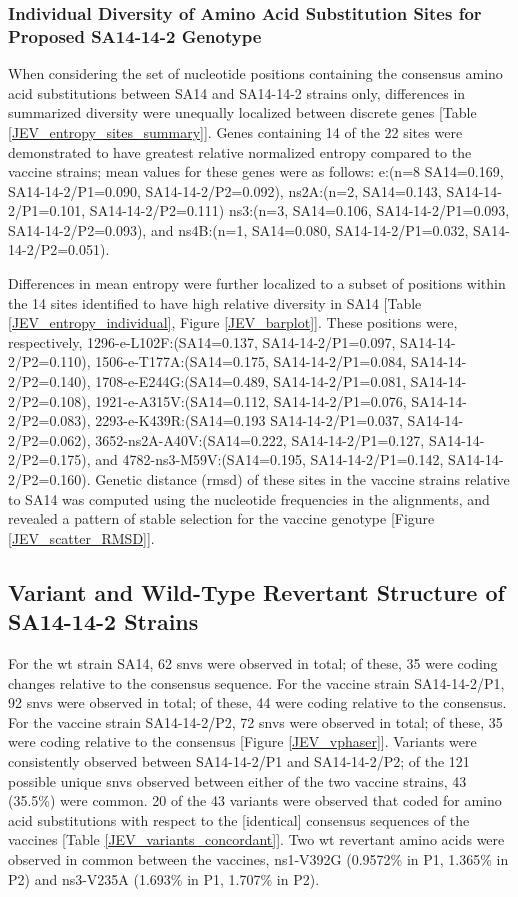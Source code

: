 \subsubsection{Individual Diversity of Amino Acid Substitution Sites for Proposed SA14-14-2 Genotype}
When considering the set of nucleotide positions containing the consensus amino acid substitutions between SA14 and SA14-14-2 strains only, differences in summarized diversity were unequally localized between discrete genes [Table \ref{JEV_entropy_sites_summary}].  Genes containing 14 of the 22  sites were demonstrated to have greatest relative normalized entropy compared to the vaccine strains; mean values for these genes were as follows: \Gls{e}:(n=8 SA14=0.169, SA14-14-2/P1=0.090, SA14-14-2/P2=0.092), \gls{ns}2A:(n=2, SA14=0.143, SA14-14-2/P1=0.101, SA14-14-2/P2=0.111) \gls{ns}3:(n=3, SA14=0.106,  SA14-14-2/P1=0.093, SA14-14-2/P2=0.093), and \gls{ns}4B:(n=1, SA14=0.080, SA14-14-2/P1=0.032, SA14-14-2/P2=0.051).

Differences in mean entropy were further localized to a subset of positions within the 14 sites identified to have high relative diversity in SA14 [Table \ref{JEV_entropy_individual}, Figure \ref{JEV_barplot}]. These positions were, respectively, 1296-\gls{e}-L102F:(SA14=0.137, SA14-14-2/P1=0.097, SA14-14-2/P2=0.110), 1506-\gls{e}-T177A:(SA14=0.175, SA14-14-2/P1=0.084, SA14-14-2/P2=0.140), 1708-\gls{e}-E244G:(SA14=0.489, SA14-14-2/P1=0.081, SA14-14-2/P2=0.108), 1921-\gls{e}-A315V:(SA14=0.112, SA14-14-2/P1=0.076, SA14-14-2/P2=0.083), 2293-\gls{e}-K439R:(SA14=0.193 SA14-14-2/P1=0.037, SA14-14-2/P2=0.062), 3652-\gls{ns}2A-A40V:(SA14=0.222, SA14-14-2/P1=0.127, SA14-14-2/P2=0.175), and 4782-\gls{ns}3-M59V:(SA14=0.195, SA14-14-2/P1=0.142, SA14-14-2/P2=0.160). Genetic distance (\gls{rmsd}) of these sites in the vaccine strains relative to SA14 was computed using the nucleotide frequencies in the alignments, and revealed a pattern of stable selection for the vaccine genotype [Figure \ref{JEV_scatter_RMSD}].

\subsection{Variant and Wild-Type Revertant Structure of SA14-14-2 Strains}
For the \gls{wt} strain SA14, 62 \glspl{snv} were observed in total; of these, 35 were coding changes relative to the consensus sequence. For the vaccine strain SA14-14-2/P1, 92 \glspl{snv} were observed in total; of these, 44 were coding relative to the consensus. For the vaccine strain SA14-14-2/P2, 72 \glspl{snv} were observed in total; of these, 35 were coding relative to the consensus [Figure \ref{JEV_vphaser}]. Variants were consistently observed between SA14-14-2/P1 and SA14-14-2/P2; of the 121 possible unique \glspl{snv} observed between either of the two vaccine strains, 43 (35.5\%) were common. 20 of the 43 variants were observed that coded for amino acid substitutions with respect to the [identical] consensus sequences of the vaccines [Table \ref{JEV_variants_concordant}]. Two \gls{wt} revertant amino acids were observed in common between the vaccines, \gls{ns}1-V392G (0.9572\% in P1, 1.365\% in P2) and \gls{ns}3-V235A (1.693\% in P1, 1.707\% in P2).
